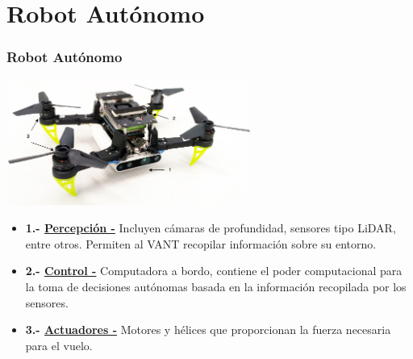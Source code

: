 \documentclass[
  24pt, %
  aspectratio=169, %
]{beamer}
\begin{document}
\section{Robot Autónomo}
\begin{frame}
  \frametitle{Robot Autónomo}

  \centering
  \includegraphics[width=8cm]{drone_taxo}
  \bigskip %
  \begin{itemize}
  \item \textbf{1.- \underline{Percepción -}} Incluyen cámaras de profundidad, sensores tipo LiDAR, entre otros. Permiten al VANT recopilar información sobre su entorno.
  \item \textbf{2.- \underline{Control -}} Computadora a bordo, contiene el poder computacional para la toma de decisiones autónomas basada en la información recopilada por los sensores.
  \item \textbf{3.- \underline{Actuadores -}} Motores y hélices que proporcionan la fuerza necesaria para el vuelo.
  \end{itemize}
\end{frame}
\end{document}
